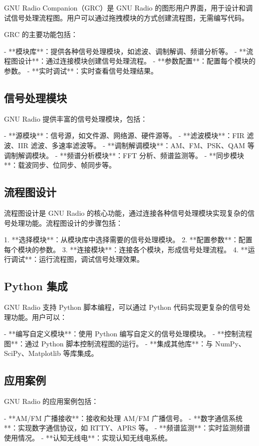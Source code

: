 \documentclass[UTF8]{ctexbook}
\begin{document}
GNU Radio Companion（GRC）是 GNU Radio 的图形用户界面，用于设计和调试信号处理流程图。用户可以通过拖拽模块的方式创建流程图，无需编写代码。

GRC 的主要功能包括：

- **模块库**：提供各种信号处理模块，如滤波、调制解调、频谱分析等。
- **流程图设计**：通过连接模块创建信号处理流程。
- **参数配置**：配置每个模块的参数。
- **实时调试**：实时查看信号处理结果。

\subsection{信号处理模块}

GNU Radio 提供丰富的信号处理模块，包括：

- **源模块**：信号源，如文件源、网络源、硬件源等。
- **滤波模块**：FIR 滤波、IIR 滤波、多速率滤波等。
- **调制解调模块**：AM、FM、PSK、QAM 等调制解调模块。
- **频谱分析模块**：FFT 分析、频谱监测等。
- **同步模块**：载波同步、位同步、帧同步等。

\subsection{流程图设计}

流程图设计是 GNU Radio 的核心功能，通过连接各种信号处理模块实现复杂的信号处理功能。流程图设计的步骤包括：

1. **选择模块**：从模块库中选择需要的信号处理模块。
2. **配置参数**：配置每个模块的参数。
3. **连接模块**：连接各个模块，形成信号处理流程。
4. **运行调试**：运行流程图，调试信号处理效果。

\subsection{Python 集成}

GNU Radio 支持 Python 脚本编程，可以通过 Python 代码实现更复杂的信号处理功能。用户可以：

- **编写自定义模块**：使用 Python 编写自定义的信号处理模块。
- **控制流程图**：通过 Python 脚本控制流程图的运行。
- **集成其他库**：与 NumPy、SciPy、Matplotlib 等库集成。

\subsection{应用案例}

GNU Radio 的应用案例包括：

- **AM/FM 广播接收**：接收和处理 AM/FM 广播信号。
- **数字通信系统**：实现数字通信协议，如 RTTY、APRS 等。
- **频谱监测**：实时监测频谱使用情况。
- **认知无线电**：实现认知无线电系统。
\end{document}
